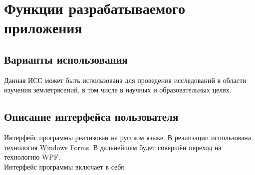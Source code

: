 \documentclass[a4paper,12pt, fleqn]{article}
\theoremstyle{plain} %
\theoremstyle{definition} %
\theoremstyle{remark} %
\numberwithin{equation}{section}
\begin{document}
\section{Функции разрабатываемого приложения}

\subsection{Варианты использования}
Данная ИСС может быть использована для проведения исследований в области изучения землетрясений, в том числе в научных и образовательных целях.

\subsection{Описание интерфейса пользователя}
Интерфейс программы реализован на русском языке. В реализации использована технология Windows Forms. В дальнейшем будет совершён переход на технологию WPF.\\
Интерфейс программы включает в себя:
\end{document}
